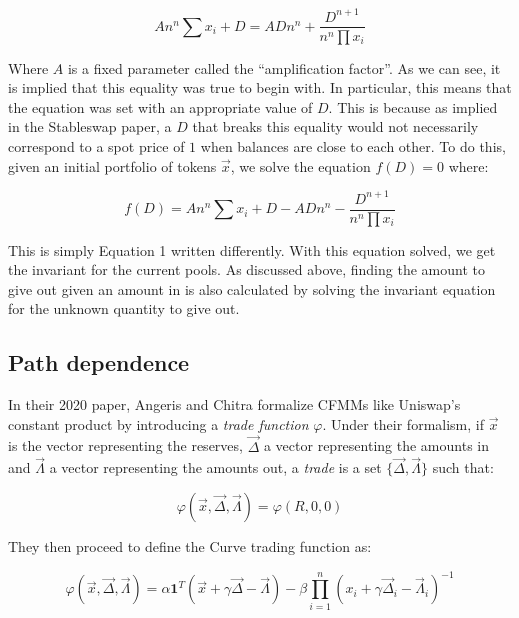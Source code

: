 \documentclass{article}
\begin{document}
    \begin{equation}
        A n^{n} \sum x_{i}+D=A D n^{n}+\frac{D^{n+1}}{n^{n} \prod x_{i}}
    \end{equation}

    Where $A$ is a fixed parameter called the ``amplification factor''. As we can see, it is implied that this equality was true to begin with. In particular, this means that the equation was set with an appropriate value of $D$. This is because as implied in the Stableswap paper, a $D$ that breaks this equality would not necessarily correspond to a spot price of $1$ when balances are close to each other. To do this, given an initial portfolio of tokens $\vec{x}$, we solve the equation $f(D) = 0$ where: 

    \begin{equation}
        f(D) = A n^{n} \sum x_{i}+D - A D n^{n} -\frac{D^{n+1}}{n^{n} \prod x_{i}}
    \end{equation}

    This is simply Equation 1 written differently. With this equation solved, we get the invariant for the current pools. As discussed above, finding the amount to give out given an amount in is also calculated by solving the invariant equation for the unknown quantity to give out. 

    \subsection{Path dependence}

    In their 2020 paper, Angeris and Chitra \cite{angeris2020} formalize CFMMs like Uniswap's constant product by introducing a \textit{trade function} $\varphi$. Under their formalism, if $\vec{x}$ is the vector representing the reserves, $\vec{\Delta}$ a vector representing the amounts in and $\vec{\Lambda}$ a vector representing the amounts out, a \textit{trade} is a set $\{\vec{\Delta}, \vec{\Lambda}\}$ such that:

    \begin{equation}
        \varphi(\vec{x}, \vec{\Delta}, \vec{\Lambda}) = \varphi(R, 0,0)
    \end{equation}

    They then proceed to define the Curve trading function as: 

    \begin{equation}
        \varphi(\vec{x}, \vec{\Delta}, \vec{\Lambda})=\alpha \mathbf{1}^{T}(\vec{x}+\gamma \vec{\Delta}-\vec{\Lambda})-\beta \prod_{i=1}^{n}\left(x_{i}+\gamma \vec{\Delta}_{i}-\vec{\Lambda}_{i}\right)^{-1}
    \end{equation}
\end{document}
